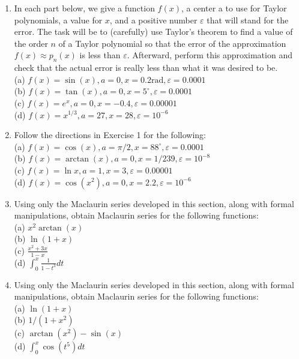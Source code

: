 \documentclass[../main.tex]{subfiles}
\begin{document}
\begin{enumerate}
\item In each part below, we give a function $f(x)$, a center a to use for Taylor polynomials, a value for $x$, and a positive number $\varepsilon$ that will stand for the error. The task will be to (carefully) use Taylor's theorem to find a value of the order $n$ of a Taylor polynomial so that the error of the approximation $f(x) \approx p_{n}(x)$ is less than $\varepsilon$. Afterward, perform this approximation and check that the actual error is really less than what it was desired to be.\\
(a) $f(x)=\sin (x), a=0, x=0.2 \mathrm{rad}, \varepsilon=0.0001$\\
(b) $f(x)=\tan (x), a=0, x=5^{\circ}, \varepsilon=0.0001$\\
(c) $f(x)=e^{x}, a=0, x=-0.4, \varepsilon=0.00001$\\
(d) $f(x)=x^{1 / 3}, a=27, x=28, \varepsilon=10^{-6}$

\item Follow the directions in Exercise 1 for the following:\\
(a) $f(x)=\cos (x), a=\pi / 2, x=88^{\circ}, \varepsilon=0.0001$\\
(b) $f(x)=\arctan (x), a=0, x=1 / 239, \varepsilon=10^{-8}$\\
(c) $f(x)=\ln x, a=1, x=3, \varepsilon=0.00001$\\
(d) $f(x)=\cos \left(x^{2}\right), a=0, x=2.2, \varepsilon=10^{-6}$

\item Using only the Maclaurin series developed in this section, along with formal manipulations, obtain Maclaurin series for the following functions:\\
(a) $x^{2} \arctan (x)$\\
(b) $\ln (1+x)$\\
(c) $\frac{x^{2}+3 x}{1-x}$\\
(d) $\int_{0}^{x} \frac{1}{1-t^{3}} d t$

\item Using only the Maclaurin series developed in this section, along with formal manipulations, obtain Maclaurin series for the following functions:\\
(a) $\ln (1+x)$\\
(b) $1 /\left(1+x^{2}\right)$\\
(c) $\arctan \left(x^{2}\right)-\sin (x)$\\
(d) $\int_{0}^{x} \cos \left(t^{5}\right) d t$


\end{enumerate}
\end{document}
